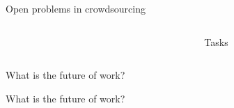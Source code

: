 \documentclass[presentation]{subfiles}
\begin{document}
\begin{frame}{Open problems in crowdsourcing}
\begin{columns}
\begin{column}[T]{0.25\textwidth}
\begin{figure}
  \end{figure}
\end{column}

\begin{column}[T]{0.25\textwidth}
\centering
\vspace{5mm}


\small{Tasks}


\end{column}
\end{columns}
\end{frame}


\begin{frame}[standout]
    What is the future of work?
\end{frame}

\begin{frame}{What is the future of work?}
    
\end{frame}
\end{document}
